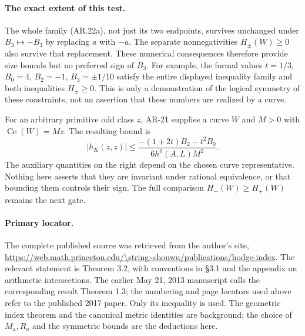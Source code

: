 \paragraph{The exact extent of this test.}
The whole family (AR.22a), not just its two endpoints, survives
unchanged under $B_3\mapsto-B_3$ by replacing $a$ with $-a$.
The separate nonnegativities $H_\pm(W)\ge0$ also survive that
replacement.  These numerical consequences therefore provide size
bounds but no preferred sign of $B_3$.  For example, the formal
values $t=1/3$, $B_0=4$, $B_2=-1$, $B_3=\pm1/10$ satisfy the
entire displayed inequality family and both inequalities
$H_\pm\ge0$.  This is only a demonstration of the logical symmetry
of these constraints, not an assertion that these numbers are
realized by a curve.

For an arbitrary primitive odd class $z$, AR-21 supplies a curve
$W$ and $M>0$ with $\operatorname{Ce}(W)=Mz$.  The resulting bound
is
\[
 |h_K(z,z)|\le
 \frac{-(1+2t)B_2-t^2B_0}{6h^0(A,L)M^2}.          \tag{AR.22e}
\]
The auxiliary quantities on the right depend on the chosen curve
representative.  Nothing here asserts that they are invariant under
rational equivalence, or that bounding them controls their sign.
The full comparison $H_-(W)\ge H_+(W)$ remains the next gate.

\paragraph{Primary locator.}
The complete published source was retrieved from the author's site,
\url{https://web.math.princeton.edu/\string~shouwu/publications/hodge-index}.
The relevant statement is Theorem 3.2, with conventions in
\S3.1 and the appendix on arithmetic intersections.  The earlier
May 21, 2013 manuscript calls the corresponding result Theorem 1.3;
the numbering and page locators used above refer to the published
2017 paper.  Only its inequality is used.  The geometric index
theorem and the canonical metric identities are background; the
choice of $M_a,R_a$ and the symmetric bounds are the deductions here.
